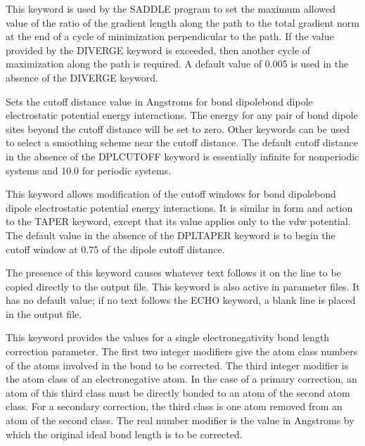 \documentclass[letterpaper,11pt,english]{sphinxmanual}
\begin{document}
  This keyword is used by the SADDLE program to set the maximum allowed value of the ratio of the gradient length along the path to the total gradient norm at the end of a cycle of minimization perpendicular to the path. If the value provided by the DIVERGE keyword is exceeded, then another cycle of maximization along the path is required. A default value of 0.005 is used in the absence of the DIVERGE keyword.

  Sets the cutoff distance value in Angstroms for bond dipole\sphinxhyphen{}bond dipole electrostatic potential energy interactions. The energy for any pair of bond dipole sites beyond the cutoff distance will be set to zero. Other keywords can be used to select a smoothing scheme near the cutoff distance. The default cutoff distance in the absence of the DPL\sphinxhyphen{}CUTOFF keyword is essentially infinite for nonperiodic systems and 10.0 for periodic systems.

  This keyword allows modification of the cutoff windows for bond dipole\sphinxhyphen{}bond dipole electrostatic potential energy interactions. It is similar in form and action to the TAPER keyword, except that its value applies only to the vdw potential. The default value in the absence of the DPL\sphinxhyphen{}TAPER keyword is to begin the cutoff window at 0.75 of the dipole cutoff distance.

  The presence of this keyword causes whatever text follows it on the line to be copied directly to the output file. This keyword is also active in parameter files. It has no default value; if no text follows the ECHO keyword, a blank line is placed in the output file.

  This keyword provides the values for a single electronegativity bond length correction parameter. The first two integer modifiers give the atom class numbers of the atoms involved in the bond to be corrected. The third integer modifier is the atom class of an electronegative atom. In the case of a primary correction, an atom of this third class must be directly bonded to an atom of the second atom class. For a secondary correction, the third class is one atom removed from an atom of the second class. The real number modifier is the value in Angstroms by which the original ideal bond length is to be corrected.
\end{document}
